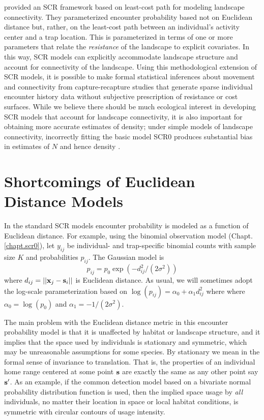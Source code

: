 \citet{royle_etal:2012ecol} provided an SCR
framework based on least-cost path for modeling landscape
connectivity. They parameterized encounter
probability
based not on Euclidean distance but, rather,
on the least-cost path between an individual's activity center and a
trap location. This is parameterized in terms of one or more
parameters that relate the {\it resistance} of the landscape to
explicit covariates.  In this way, SCR models can explicitly accommodate
landscape structure and account for connectivity of the landscape.
Using this
methodological extension of SCR models, it is possible to make formal
statistical inferences about movement and connectivity from
capture-recapture studies that generate sparse individual encounter
history data without subjective prescription of resistance or cost
surfaces. %
While we believe there
should be much ecological interest in developing SCR models that
account for landscape connectivity, it is also important for obtaining
more accurate estimates of density; under simple models of landscape
connectivity, incorrectly fitting the basic model SCR0 produces
substantial bias in estimates of $N$ and hence density  \citep{royle_etal:2012ecol}.


\section{Shortcomings of Euclidean Distance Models}

In the standard SCR models encounter probability is modeled as a
function of Euclidean distance. For example, using the binomial
observation model (Chapt. \ref{chapt.scr0}), let $y_{ij}$ be
individual- and trap-specific binomial counts with sample size $K$ and
probabilities $p_{ij}$. The Gaussian model is
\[
p_{ij} = p_{0} \exp(-  d_{ij}^2 /(2\sigma^{2}) )
\]
where $d_{ij} = ||{\bf x}_{j} - {\bf s}_{i}||$ is Euclidean
distance. As usual, we will sometimes adopt the log-scale
parameterization based on $\log(p_{ij})= \alpha_{0} + \alpha_{1}
d_{ij}^{2}$ where where $\alpha_{0} = \log(p_{0})$ and $\alpha_{1} =
-1/(2\sigma^2)$.

The main problem with the Euclidean distance metric in this encounter
probability model is that it is unaffected by habitat or landscape
structure, and it implies that the space used by individuals is
stationary and symmetric, which may be unreasonable assumptions for
some species. By stationary %
we mean in the formal sense of
invariance to translation. That is, the properties of an individual
home range centered at some point ${\bf s}$ are exactly the same as
any other point say ${\bf s}'$.  As an example, if the common
detection model based on a bivariate normal probability distribution
function is used, then the implied space usage by {\it all}
individuals, no matter their location in space or local habitat
conditions, is symmetric with circular contours of usage intensity.

